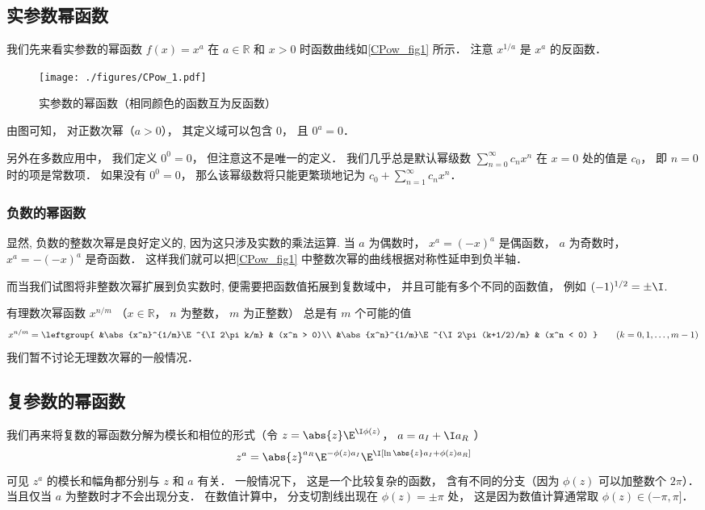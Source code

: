 

\subsection{实参数幂函数}
我们先来看实参数的幂函数 $f(x) = x^a$ 在 $a\in\mathbb R$ 和 $x > 0$ 时函数曲线如\autoref{CPow_fig1} 所示． 注意 $x^{1/a}$ 是 $x^a$ 的反函数．
\begin{figure}[ht]
\centering
\texttt{[image: ./figures/CPow\_1.pdf]}
\caption{实参数的幂函数（相同颜色的函数互为反函数）} \label{CPow_fig1}
\end{figure}

由图可知， 对正数次幂（$a > 0$）， 其定义域可以包含 $0$， 且 $0^a = 0$．

另外在多数应用中， 我们定义 $0^0 = 0$， 但注意这不是唯一的定义． 我们几乎总是默认幂级数 $\sum_{n=0}^\infty c_n x^n$ 在 $x = 0$ 处的值是 $c_0$， 即 $n=0$ 时的项是常数项． 如果没有 $0^0 = 0$， 那么该幂级数将只能更繁琐地记为 $c_0 + \sum_{n=1}^\infty c_n x^n$．

\subsubsection{负数的幂函数}
显然, 负数的整数次幂是良好定义的, 因为这只涉及实数的乘法运算. 当 $a$ 为偶数时， $x^a = (-x)^a$ 是偶函数， $a$ 为奇数时， $x^a = -(-x)^a$ 是奇函数． 这样我们就可以把\autoref{CPow_fig1} 中整数次幂的曲线根据对称性延申到负半轴．

而当我们试图将非整数次幂扩展到负实数时, 便需要把函数值拓展到复数域中， 并且可能有多个不同的函数值， 例如 $(-1)^{1/2} = \pm\I$. 

有理数次幂函数 $x^{n/m}$ （$x\in \mathbb R$， $n$ 为整数， $m$ 为正整数） 总是有 $m$ 个可能的值
\begin{equation}
x^{n/m} = \leftgroup{
&\abs{x^n}^{1/m}\E^{\I 2\pi k/m} & (x^n > 0)\\
&\abs{x^n}^{1/m}\E^{\I 2\pi (k+1/2)/m} & (x^n < 0)
}\qquad (k = 0,1,\dots, m-1)
\end{equation}
我们暂不讨论无理数次幂的一般情况．

\subsection{复参数的幂函数}
我们再来将复数的幂函数分解为模长和相位的形式（令 $z = \abs{z} \E^{\I\phi(z)}$， $a = a_I + \I a_R$ ）
\begin{equation}
z^a = \abs{z}^{a_R} \E^{-\phi(z) a_I} \E^{\I[\ln\abs{z}a_I + \phi(z)a_R]}
\end{equation}
可见 $z^a$ 的模长和幅角都分别与 $z$ 和 $a$ 有关． 一般情况下， 这是一个比较复杂的函数， 含有不同的分支（因为 $\phi(z)$ 可以加整数个 $2\pi$）．%
当且仅当 $a$ 为整数时才不会出现分支． 在数值计算中， 分支切割线出现在 $\phi(z) = \pm\pi$ 处， 这是因为数值计算通常取 $\phi(z)\in(-\pi, \pi]$．

